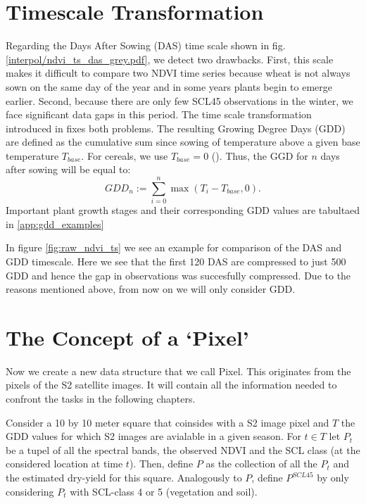 \section{Timescale Transformation}\label{sec:gdd_def}
	{%
		Regarding the Days After Sowing (DAS) time scale shown in fig. \ref{interpol/ndvi_ts_das_grey.pdf}, we detect two drawbacks. First, this scale makes it difficult to compare two NDVI time series because wheat is not always sown on the same day of the year and in some years plants begin to emerge earlier. Second, because there are only few SCL45 observations in the winter, we face significant data gaps in this period. The time scale transformation introduced in \cite{mcmasterGrowingDegreedaysOne1997} fixes both problems. The resulting Growing Degree Days ({GDD}) are defined as the cumulative sum since sowing of temperature above a given base temperature $T_{base}$. For cereals, we use $T_{base}=0$ (\cite{perichPixelbasedCropYield2022}). Thus, the GGD for $n$ days after sowing will be equal to:
		\begin{equation}
			\label{eq:gdd}
			GDD_n := \sum_{i=0}^n \max(T_i - T_{base}, 0).
		\end{equation}
		Important plant growth stages and their corresponding GDD values are tabultaed in \ref{app:gdd_examples}

		In figure \ref{fig:raw_ndvi_ts} we see an example for comparison of the DAS and GDD timescale. Here we see that the first 120 DAS are compressed to just 500 GDD and hence the gap in observations was succesfully compressed. Due to the reasons mentioned above, from now on we will only consider GDD.
	} 

\section{The Concept of a `Pixel'}{ \label{sec:gather_data_to_pixel}
	Now we create a new data structure that we call Pixel. This originates from the pixels of the S2 satellite images. It will contain all the information needed to confront the tasks in the following chapters. 
		
		Consider a 10 by 10 meter square that coinsides with a S2 image pixel and $T$ the GDD values for which S2 images are avialable in a given season. For $t\in T$ let $P_t$ be a tupel of all the spectral bands, the observed NDVI and the SCL class (at the considered location at time $t$). Then, define $P$ as the collection of all the $P_t$ and the estimated dry-yield for this square.
		Analogously to $P$, define $P^{SCL45}$ by only considering $P_t$ with SCL-class 4 or 5 (vegetation and soil).  
}

